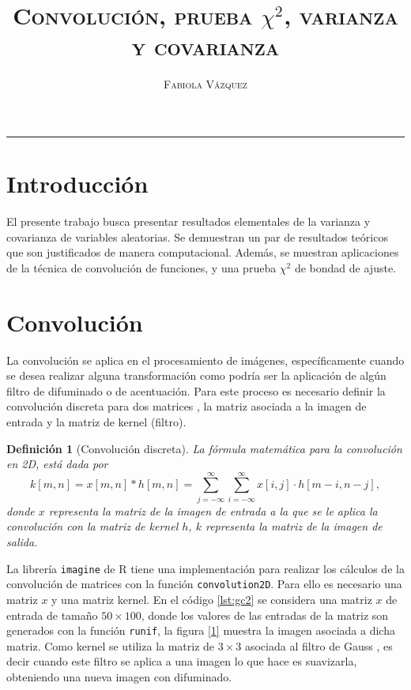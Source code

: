 \documentclass[12pt,letterpaper]{article}
\title{\textsc{Convolución, prueba $\chi^2$, varianza y covarianza}}
\author{\textsc{Fabiola Vázquez}}
\newtheorem{defi}{Definición}
\begin{document}
\maketitle
\hrule
\section{Introducción}
El presente trabajo busca presentar resultados elementales de la varianza y covarianza de variables aleatorias. Se demuestran un par de resultados teóricos que son justificados de manera computacional. Además, se muestran aplicaciones de la técnica de convolución de funciones, y una prueba $ \chi^2 $ de bondad de ajuste.

\section{Convolución}
La convolución se aplica en el procesamiento de imágenes, específicamente cuando se desea realizar alguna transformación como podría ser la aplicación de algún filtro de difuminado o de acentuación. Para este proceso es necesario definir la convolución discreta para dos matrices \cite{fcg}, la matriz asociada a la imagen de entrada y la matriz de kernel (filtro).
\begin{defi}[Convolución discreta]
La fórmula matemática para la convolución en 2D, está dada por
\begin{equation}
\label{conv}
k[m,n] = x[m,n]*h[m,n] = \sum_{j=-\infty}^{\infty} \sum_{i=-\infty}^{\infty} x[i,j] \cdot h[m-i, n-j],
\end{equation}
donde $x$ representa la matriz de la imagen de entrada a la que se le aplica la convolución con la matriz de kernel $h$, $k$ representa la matriz de la imagen de salida. 
\end{defi}

La librería \texttt{imagine} \cite{imagine} de R \cite{R} tiene una implementación para realizar los cálculos de la convolución de matrices con la función \texttt{convolution2D}. Para ello es necesario una matriz $x$ y una matriz kernel. En el código \ref{lst:gc2} se considera una matriz $x$ de entrada de tamaño $50 \times 100$, donde los valores de las entradas de la matriz son generados con la función \texttt{runif}, la figura \ref{1} muestra la imagen asociada a dicha matriz. Como kernel se utiliza la matriz de $3 \times 3$ asociada al filtro de Gauss \cite{gauss}, es decir cuando este filtro se aplica a una imagen lo que hace es suavizarla, obteniendo una nueva imagen con difuminado.
\end{document}
